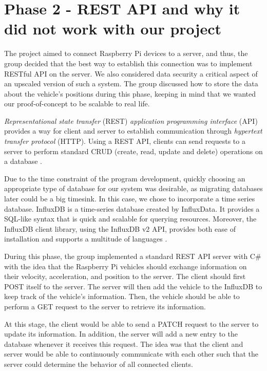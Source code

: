 
\section{Phase 2 - REST API and why it did not work with our project}\label{phase2}
The project aimed to connect Raspberry Pi devices to a server, and thus, the group decided that the best way to establish this connection was to implement RESTful API on the server. We also considered data security a critical aspect of an upscaled version of such a system. The group discussed how to store the data about the vehicle's positions during this phase, keeping in mind that we wanted our proof-of-concept to be scalable to real life.

\emph{Representational state transfer} (REST) \emph{application programming interface} (API) provides a way for client and server to establish communication through \emph{hypertext transfer protocol} (HTTP). Using a REST API, clients can send requests to a server to perform standard CRUD (create, read, update and delete) operations on a database \parencite{rest_api}.

Due to the time constraint of the program development, quickly choosing an appropriate type of database for our system was desirable, as migrating databases later could be a big timesink. In this case, we chose to incorporate a time series database. InfluxDB is a time-series database created by InfluxData. It provides a SQL-like syntax that is quick and scalable for querying resources. Moreover, the InfluxDB client library, using the InfluxDB v2 API, provides both ease of installation and supports a multitude of languages \parencite{influxdb}.

During this phase, the group implemented a standard REST API server with C\# with the idea that the Raspberry Pi vehicles should exchange information on their velocity, acceleration, and position to the server. The client should first POST itself to the server. The server will then add the vehicle to the InfluxDB to keep track of the vehicle's information. Then, the vehicle should be able to perform a GET request to the server to retrieve its information.

At this stage, the client would be able to send a PATCH request to the server to update its information. In addition, the server will add a new entry to the database whenever it receives this request. The idea was that the client and server would be able to continuously communicate with each other such that the server could determine the behavior of all connected clients.

